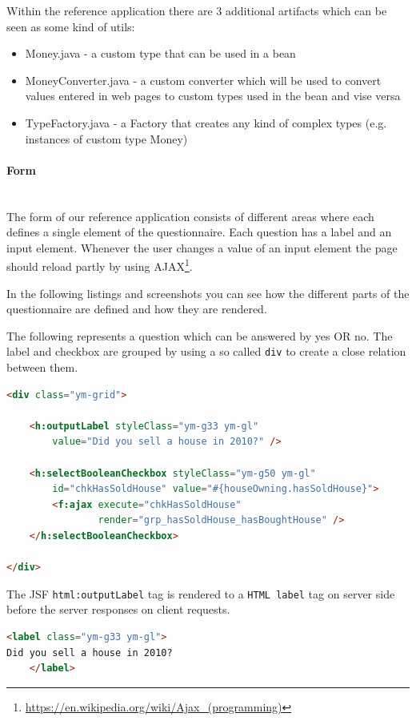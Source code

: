 Within the reference application there are 3 additional artifacts which can be
seen as some kind of utils:

\begin{itemize}
\item Money.java - a custom type that can be used in a bean
\item MoneyConverter.java - a custom converter which will be used to convert
values entered in web pages to custom types used in the bean and vise versa
\item TypeFactory.java - a Factory that creates any kind of complex types (e.g.
instances of custom type Money)
\end{itemize} 


\paragraph{Form} $\;$ \\
The form of our reference application consists of different areas where each
defines a single element of the questionnaire. Each question has a label and an
input element. Whenever the user changes a value of an input element the page should reload partly by using
AJAX\footnote{\url{https://en.wikipedia.org/wiki/Ajax\_(programming)}}.

In the following listings and screenshots you can see how the different parts
of the questionnaire are defined and how they are rendered. 

The following represents a question which can be answered by yes OR no. The
label and checkbox are grouped by using a so called \texttt{div} to create a close relation
between them.

\begin{lstlisting}[language=HTML]
<div class="ym-grid">

	<h:outputLabel styleClass="ym-g33 ym-gl"
		value="Did you sell a house in 2010?" />

	<h:selectBooleanCheckbox styleClass="ym-g50 ym-gl"
		id="chkHasSoldHouse" value="#{houseOwning.hasSoldHouse}">
		<f:ajax execute="chkHasSoldHouse"
				render="grp_hasSoldHouse_hasBoughtHouse" />
	</h:selectBooleanCheckbox>

</div>
\end{lstlisting}

The JSF \texttt{html:outputLabel} tag is rendered to a \texttt{HTML
label} tag on server side before the server responses on client requests. 

\begin{lstlisting}[language=HTML]
<label class="ym-g33 ym-gl">
Did you sell a house in 2010?
    </label>
\end{lstlisting}

